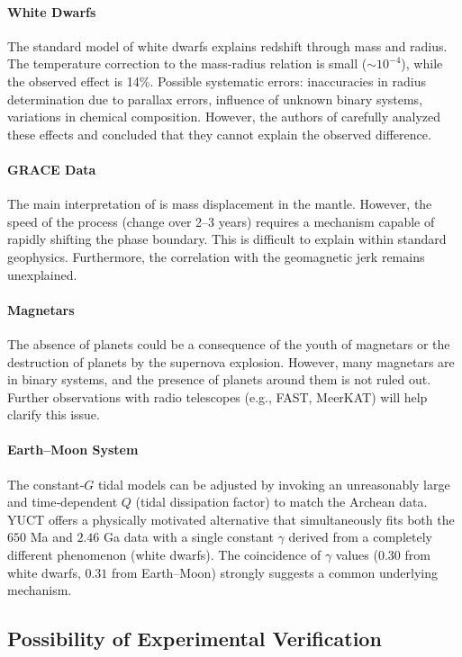 \documentclass[12pt]{article}
\theoremstyle{remark}
\begin{document}
	\paragraph{White Dwarfs}
	The standard model of white dwarfs explains redshift through mass and radius. The temperature correction to the mass-radius relation is small ($\sim 10^{-4}$), while the observed effect is 14\%. Possible systematic errors: inaccuracies in radius determination due to parallax errors, influence of unknown binary systems, variations in chemical composition. However, the authors of \cite{Crumpler2024} carefully analyzed these effects and concluded that they cannot explain the observed difference.
	
	\paragraph{GRACE Data}
	The main interpretation of \cite{Rosat2025} is mass displacement in the mantle. However, the speed of the process (change over 2–3 years) requires a mechanism capable of rapidly shifting the phase boundary. This is difficult to explain within standard geophysics. Furthermore, the correlation with the geomagnetic jerk remains unexplained.
	
	\paragraph{Magnetars}
	The absence of planets could be a consequence of the youth of magnetars or the destruction of planets by the supernova explosion. However, many magnetars are in binary systems, and the presence of planets around them is not ruled out. Further observations with radio telescopes (e.g., FAST, MeerKAT) will help clarify this issue.
	
	\paragraph{Earth–Moon System}
	The constant‑$G$ tidal models can be adjusted by invoking an unreasonably large and time‑dependent $Q$ (tidal dissipation factor) to match the Archean data. YUCT offers a physically motivated alternative that simultaneously fits both the $650$ Ma and $2.46$ Ga data with a single constant $\gamma$ derived from a completely different phenomenon (white dwarfs). The coincidence of $\gamma$ values ($0.30$ from white dwarfs, $0.31$ from Earth–Moon) strongly suggests a common underlying mechanism.
	
	\subsection{Possibility of Experimental Verification}
	\label{subsec:discussion-experiment}
	
\end{document}
